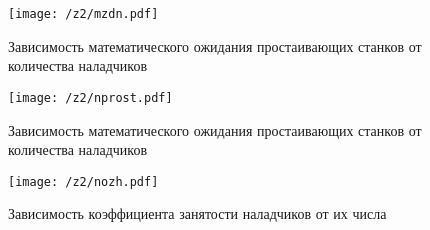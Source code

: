 \begin{figure}[H]
	\begin{center}
        \texttt{[image: /z2/mzdn.pdf]}
        \caption{Зависимость математического ожидания простаивающих станков от количества наладчиков}
	\end{center}
\end{figure}

\begin{figure}[H]
	\begin{center}
        \texttt{[image: /z2/nprost.pdf]}
        \caption{Зависимость математического ожидания простаивающих станков от количества наладчиков}
	\end{center}
\end{figure}

\begin{figure}[H]
	\begin{center}
        \texttt{[image: /z2/nozh.pdf]}
        \caption{Зависимость коэффициента занятости наладчиков от их числа}
	\end{center}
\end{figure}